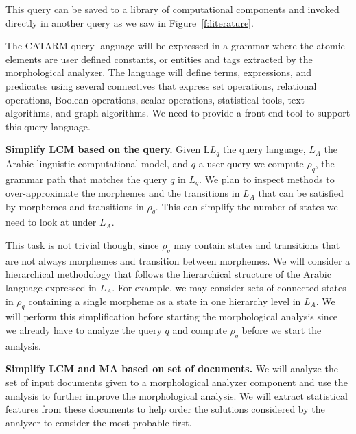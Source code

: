 \documentclass[12pt]{article}
\begin{document}
{This query can be saved to a library of computational components
and invoked directly in another query 
as we saw in Figure~\ref{f:literature}.

\begin{figure}
\end{figure}

The CATARM query language will be expressed in a grammar 
where the atomic elements are user defined constants, or
entities and tags extracted by the morphological analyzer. 
The language will define terms, expressions, and predicates
using several connectives that express set operations, 
relational operations, Boolean operations, scalar operations, 
statistical tools, text algorithms, and graph algorithms. 
We need to provide a front end tool to support this query
language.

{\bf Simplify LCM based on the query.}
Given
L$L_q$ the query language, 
$L_A$ the Arabic linguistic
computational model, and  $q$ a user query
we compute $\rho_q$, the grammar path that matches 
the query $q$ in $L_q$. 
We plan to inspect methods to over-approximate 
the morphemes and the transitions in $L_A$ 
that can be satisfied by morphemes and transitions
in $\rho_q$. 
This can simplify the number of states we need to 
look at under $L_A$. 

This task is not trivial though, since $\rho_q$ may contain
states and transitions that are not always morphemes and 
transition between morphemes. 
We will consider a hierarchical methodology that follows 
the hierarchical structure of the Arabic language expressed
in $L_A$. For example,
we may consider sets of connected states in $\rho_q$ 
containing a single morpheme as a state in one hierarchy level 
in $L_A$.
We will perform this simplification before starting the 
morphological analysis since we already have to analyze
the query $q$ and compute $\rho_q$ before we start
the analysis. 

{\bf Simplify LCM and MA based on set of documents.}
We will analyze the set of input documents given to a
morphological analyzer component and use the analysis
to further improve the morphological analysis. 
We will extract statistical features from these documents 
to help order the solutions considered by the analyzer
to consider the most probable first. 

}
\end{document}
